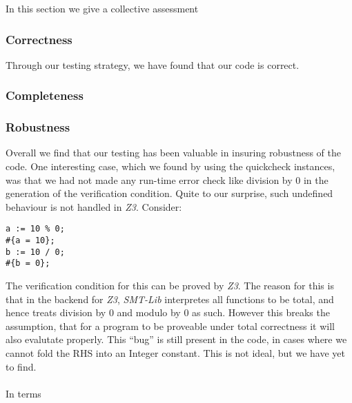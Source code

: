 In this section we give a collective assessment



\subsubsection{Correctness}
Through our testing strategy, we have found that our code is correct.


\subsubsection{Completeness}

\subsubsection{Robustness}
Overall we find that our testing has been valuable in insuring robustness of the code.
One interesting case, which we found by using the quickcheck instances, was that we had not made any run-time error check like division by 0 in the generation of the verification condition.
Quite to our surprise, such undefined behaviour is not handled in \textit{Z3}. Consider:
\begin{lstlisting}
a := 10 % 0;
#{a = 10};
b := 10 / 0;
#{b = 0};
\end{lstlisting}
The verification condition for this can be proved by \textit{Z3}.
The reason for this is that in the backend for \textit{Z3}, \textit{SMT-Lib} interpretes all functions to be total, and hence treats division by 0 and modulo by 0 as such. However this breaks the assumption, that for a program to be proveable under total correctness it will also evalutate properly. This ``bug'' is still present in the code, in cases where we cannot fold the RHS into an Integer constant. This is not ideal, but we have yet to find.
\\~\\
In terms

